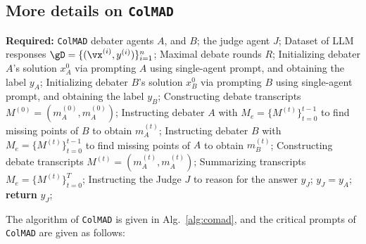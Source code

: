 \documentclass{article} %
\newcommand{\ours}[0]{\texttt{ColMAD}\xspace}
\begin{document}
\subsection{More details on \ours}
\begin{algorithm}[H]
        \caption{The \ours Framework}
        \label{alg:comad}
        \begin{algorithmic}[1]
        \STATE  \textbf{Required:} \ours debater agents $A$, and $B$; the judge agent $J$; Dataset of LLM responses $\gD = \{(\vx^{(i)}, y^{(i)})\}_{i=1}^{n}$; Maximal debate rounds $R$;
        \STATE Initializing debater $A$'s solution $x_A^0$ via prompting $A$ using single-agent prompt, and obtaining the label $y_A$;
        \STATE Initializing debater $B$'s solution $x_B^0$ via prompting $B$ using single-agent prompt, and obtaining the label $y_B$;
        \STATE Constructing debate transcripts $M^{(0)}=(m_A^{(0)},m_A^{(0)})$;
        \STATE Instructing debater $A$ with $M_e=\{M^{(t)}\}_{t=0}^{t-1}$ to find missing points of $B$ to obtain $m_A^{(t)}$;
        \STATE Instructing debater $B$ with $M_e=\{M^{(t)}\}_{t=0}^{t-1}$ to find missing points of $A$ to obtain $m_B^{(t)}$;
        \STATE Constructing debate transcripts $M^{(t)}=(m_A^{(t)},m_A^{(t)})$;
        \ENDFOR
        \STATE Summarizing transcripts $M_e=\{M^{(t)}\}_{t=0}^{T}$;
        \STATE Instructing the Judge $J$ to reason for the answer $y_J$;
        \ELSE
        \STATE $y_J = y_A$;
        \ENDIF
        \STATE \textbf{return} $y_J$;
        \end{algorithmic}
\end{algorithm}

The algorithm of \ours is given in Alg.~\ref{alg:comad}, and the critical prompts of \ours are given as follows:
\end{document}
